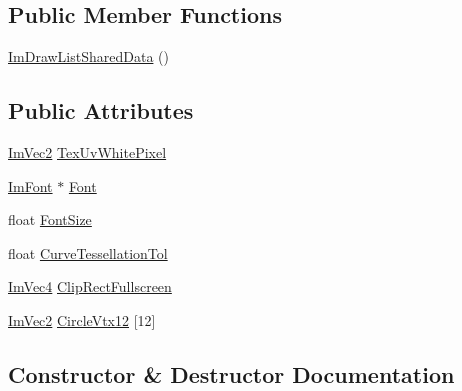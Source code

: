 \subsection*{Public Member Functions}
\begin{DoxyCompactItemize}
\item 
\mbox{\hyperlink{struct_im_draw_list_shared_data_a3fe9d30c0df68cce4db9d2033ba9a589}{Im\+Draw\+List\+Shared\+Data}} ()
\end{DoxyCompactItemize}
\subsection*{Public Attributes}
\begin{DoxyCompactItemize}
\item 
\mbox{\hyperlink{struct_im_vec2}{Im\+Vec2}} \mbox{\hyperlink{struct_im_draw_list_shared_data_a8dff5fc643cab17128012383d75d9ad8}{Tex\+Uv\+White\+Pixel}}
\item 
\mbox{\hyperlink{struct_im_font}{Im\+Font}} $\ast$ \mbox{\hyperlink{struct_im_draw_list_shared_data_a4542431d4afe5320a965fbe52a3cc39f}{Font}}
\item 
float \mbox{\hyperlink{struct_im_draw_list_shared_data_a189a412fcd4f66a1d60501ad758d04bd}{Font\+Size}}
\item 
float \mbox{\hyperlink{struct_im_draw_list_shared_data_a5b5bb46f5fd714b43e4b73a131b7f6f7}{Curve\+Tessellation\+Tol}}
\item 
\mbox{\hyperlink{struct_im_vec4}{Im\+Vec4}} \mbox{\hyperlink{struct_im_draw_list_shared_data_ac8737a7aae92c55d75998a6c9f6f3882}{Clip\+Rect\+Fullscreen}}
\item 
\mbox{\hyperlink{struct_im_vec2}{Im\+Vec2}} \mbox{\hyperlink{struct_im_draw_list_shared_data_aca28baf42970650f5ee59c71dc905971}{Circle\+Vtx12}} \mbox{[}12\mbox{]}
\end{DoxyCompactItemize}


\subsection{Constructor \& Destructor Documentation}
\mbox{\label{struct_im_draw_list_shared_data_a3fe9d30c0df68cce4db9d2033ba9a589}} 
